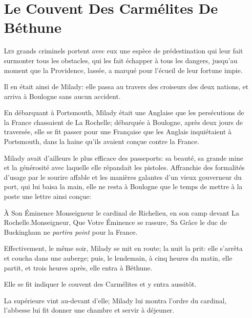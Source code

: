 
\chapter{Le Couvent Des Carmélites De Béthune}

\lettrine{L}{es} grands criminels portent avec eux une espèce de prédestination qui leur fait surmonter tous les obstacles, qui les fait échapper à tous les dangers, jusqu'au moment que la Providence, lassée, a marqué pour l'écueil de leur fortune impie. 

Il en était ainsi de Milady: elle passa au travers des croiseurs des deux nations, et arriva à Boulogne sans aucun accident. 

En débarquant à Portsmouth, Milady était une Anglaise que les persécutions de la France chassaient de La Rochelle; débarquée à Boulogne, après deux jours de traversée, elle se fit passer pour une Française que les Anglais inquiétaient à Portsmouth, dans la haine qu'ils avaient conçue contre la France. 

Milady avait d'ailleurs le plus efficace des passeports: sa beauté, sa grande mine et la générosité avec laquelle elle répandait les pistoles. Affranchie des formalités d'usage par le sourire affable et les manières galantes d'un vieux gouverneur du port, qui lui baisa la main, elle ne resta à Boulogne que le temps de mettre à la poste une lettre ainsi conçue: 

\begin{mail}{À Son Éminence Monseigneur le cardinal de Richelieu, en son camp devant La Rochelle.}{Monseigneur,} 
Que Votre Éminence se rassure, Sa Grâce le duc de Buckingham ne \textit{partira point} pour la France.	
\end{mail}

Effectivement, le même soir, Milady se mit en route; la nuit la prit: elle s'arrêta et coucha dans une auberge; puis, le lendemain, à cinq heures du matin, elle partit, et trois heures après, elle entra à Béthune. 

Elle se fit indiquer le couvent des Carmélites et y entra aussitôt. 

La supérieure vint au-devant d'elle; Milady lui montra l'ordre du cardinal, l'abbesse lui fit donner une chambre et servir à déjeuner. 

